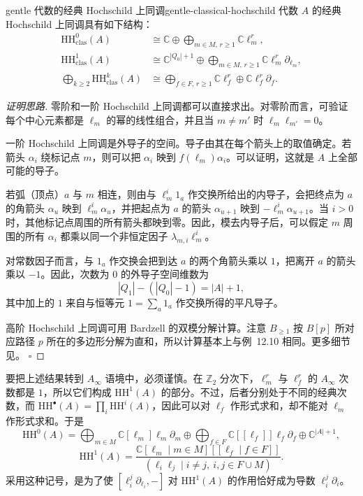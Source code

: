 \begin{theorem}{gentle 代数的经典 Hochschild 上同调}{gentle-classical-hochschild}
代数 $A$ 的经典 Hochschild 上同调具有如下结构：
\begin{align*}
  \mathrm{HH}^{0}_{\mathrm{clas}}(A)
  &\cong\mathbb C\oplus\bigoplus_{m\in M,\,r\geq1}\mathbb C\ell_m^r,\\
  \mathrm{HH}^{1}_{\mathrm{clas}}(A)
  &\cong\mathbb C^{|Q_0|+1}\oplus\bigoplus_{m\in M,\,r\geq1}\mathbb C\ell_m^r\partial_{\ell_m},\\
  \bigoplus_{k\geq2}\mathrm{HH}^{k}_{\mathrm{clas}}(A)
  &\cong\bigoplus_{f\in F,\,r\geq1}\mathbb C\ell_f^r
    \oplus\mathbb C\ell_f^r\partial_f.
\end{align*}
\end{theorem}
\begin{proof}[证明思路]
零阶和一阶 Hochschild 上同调都可以直接求出。对零阶而言，可验证每个中心元素都是 $\ell_m$ 的幂的线性组合，并且当 $m\ne m'$ 时 $\ell_m\ell_{m'}=0$。

一阶 Hochschild 上同调是外导子的空间。导子由其在每个箭头上的取值确定。若箭头 $\alpha_i$ 绕标记点 $m$，则可以把 $\alpha_i$ 映到 $f(\ell_m)\alpha_i$。可以证明，这就是 $A$ 上全部可能的导子。

若弧（顶点）$a$ 与 $m$ 相连，则由与 $\ell_m^i1_a$ 作交换所给出的内导子，会把终点为 $a$ 的角箭头 $\alpha_u$ 映到 $\ell_m^i\alpha_u$，并把起点为 $a$ 的箭头 $\alpha_{u+1}$ 映到 $-\ell_m^i\alpha_{u+1}$。当 $i>0$ 时，其他标记点周围的所有箭头都映到零。因此，模去内导子后，可以假定 $m$ 周围的所有 $\alpha_i$ 都乘以同一个非恒定因子 $\lambda_{m,i}\ell_m^i$。

对常数因子而言，与 $1_a$ 作交换会把到达 $a$ 的两个角箭头乘以 $1$，把离开 $a$ 的箭头乘以 $-1$。因此，次数为 $0$ 的外导子空间维数为
\[
  |Q_1|-(|Q_0|-1)=|A|+1,
\]
其中加上的 $1$ 来自与恒等元 $1=\sum_a1_a$ 作交换所得的平凡导子。

高阶 Hochschild 上同调可用 Bardzell 的双模分解计算。注意 $B_{\geq1}$ 按 $B[p]$ 所对应路径 $p$ 所在的多边形分解为直和，所以计算基本上与例~12.10 相同。更多细节见。
\hfill$\square$
\end{proof}

要把上述结果转到 $A_\infty$ 语境中，必须谨慎。在 $\mathbb Z_2$ 分次下，$\ell_m^r$ 与 $\ell_f^r$ 的 $A_\infty$ 次数都是 $1$，所以它们构成 $\mathrm{HH}^1(A)$ 的部分。不过，后者分别处于不同的经典次数，而 $\mathrm{HH}^{\bullet}(A)=\prod_i\mathrm{HH}^i(A)$，因此可以对 $\ell_f$ 作形式求和，却不能对 $\ell_m$ 作形式求和。于是
\[
  \mathrm{HH}^{0}(A)
  =\bigoplus_{m\in M}\mathbb C[\ell_m]\ell_m\partial_m
   \oplus\bigoplus_{f\in F}\mathbb C[[\ell_f]]\ell_f\partial_f
   \oplus\mathbb C^{|A|+1},
\]
\[
  \mathrm{HH}^{1}(A)
  =\frac{\mathbb C[\ell_m\mid m\in M][[\ell_f\mid f\in F]]}
  {(\ell_i\ell_j\mid i\ne j,\ i,j\in F\cup M)}.
\]
采用这种记号，是为了使 $[\ell_i^j\partial_{\ell_i},-]$ 对 $\mathrm{HH}^1(A)$ 的作用恰好成为导数 $\ell_i^j\partial_i$。

